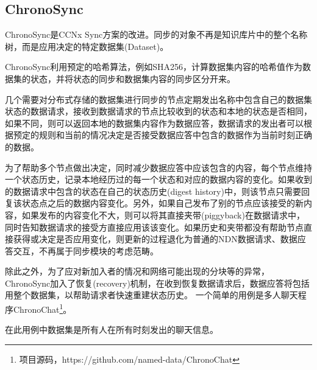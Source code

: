 \subsection*{ChronoSync}
\par
ChronoSync是CCNx Sync方案的改进。同步的对象不再是知识库片中的整个名称树，而是应用决定的特定数据集(Dataset)。
\par
ChronoSync利用预定的哈希算法，例如SHA256，计算数据集内容的哈希值作为数据集的状态，并将状态的同步和数据集内容的同步区分开来。\cite{ChronosRef2}
\par
几个需要对分布式存储的数据集进行同步的节点定期发出名称中包含自己的数据集状态的数据请求，接收到数据请求的节点比较收到的状态和本地的状态是否相同，如果不同，则可以返回本地的数据集内容作为数据应答，数据请求的发出者可以根据预定的规则和当前的情况决定是否接受数据应答中包含的数据作为当前时刻正确的数据。
\par
为了帮助多个节点做出决定，同时减少数据应答中应该包含的内容，每个节点维持一个状态历史，记录本地经历过的每一个状态和对应的数据内容的变化。如果收到的数据请求中包含的状态在自己的状态历史(digest history)中，则该节点只需要回复该状态点之后的数据内容变化。另外，如果自己发布了别的节点应该接受的新内容，如果发布的内容变化不大，则可以将其直接夹带(piggyback)在数据请求中，同时告知数据请求的接受方直接应用该该变化。如果历史和夹带都没有帮助节点直接获得或决定是否应用变化，则更新的过程退化为普通的NDN数据请求、数据应答交互，不再属于同步模块的考虑范畴。
\par
除此之外，为了应对新加入者的情况和网络可能出现的分块等的异常，ChronoSync加入了恢复(recovery)机制，在收到恢复数据请求后，数据应答将包括用整个数据集，以帮助请求者快速重建状态历史。
一个简单的用例是多人聊天程序ChronoChat\footnote{项目源码，https://github.com/named-data/ChronoChat}。
\par
在此用例中数据集是所有人在所有时刻发出的聊天信息。

